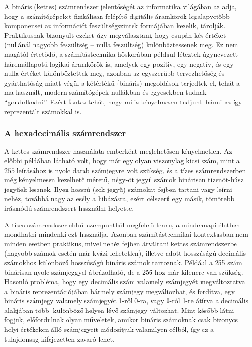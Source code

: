 A bináris (kettes) számrendszer jelentőségét az informatika világában az adja, hogy a számítógépeket fizikálisan felépítő digitális áramkörök legalapvetőbb komponensei az információt feszültségszintek formájában kezelik, tárolják. Praktikusnak bizonyult ezeket úgy megválasztani, hogy csupán két értéket (nullánál nagyobb feszültség -- nulla feszültség) különböztessenek meg. Ez nem magától értetődő, a számítástechnika hőskorában például léteztek úgynevezett háromállapotú logikai áramkörök is, amelyek egy pozitív, egy negatív, és egy nulla értéket különböztettek meg, azonban az egyszerűbb tervezhetőség és gyárthatóság miatt végül a kétértékű (bináris) megoldások terjedtek el, tehát a ma használt, modern számítógépek nullákban és egyesekben tudnak ``gondolkodni''. Ezért fontos tehát, hogy mi is kényelmesen tudjunk bánni az így reprezentált számokkal is.

\subsubsection{A hexadecimális számrendszer}
A kettes számrendszer használata emberként meglehetősen kényelmetlen. Az előbbi példában látható volt, hogy már egy olyan viszonylag kicsi szám, mint a $255$ leírásához is nyolc darab számjegyre volt szükség, és a tízes számrendszerben még kényelmesen kezelhető méretű, négy-öt jegyű számok binárisan tizenöt-húsz jegyűek lesznek. Ilyen hosszú (sok jegyű) számokat fejben tartani vagy leírni nehéz, továbbá nagy az esély a hibázásra, ezért célszerű egy másik, tömörebb írásmódú számrendszert használni helyette.

A tízes számrendszer ebből szempontból megfelelő lenne, a mindennapi életben mondhatni mindenki ezt használja. Azonban számítástechnikai kontextusban nem minden esetben praktikus, mivel nehéz fejben átváltani kettes számrendszerbe (nagyobb számok esetén már kvázi lehetetlen), illetve adott hosszúságú decimális számokhoz különböző hosszúságú bináris számok tartoznak. Például a 255 szám binárisan nyolc számjeggyel ábrázolható, de a 256-hoz már kilencre van szükség. Hasonló probléma, hogy egy decimális szám valamely számjegyét megváltoztatva a bináris reprezentációjában bármely számjegy megváltozhat, és fordítva, egy bináris számjegy valamely számjegyét 1-ről 0-ra, vagy 0-ról 1-re átírva a decimális alakjában több, különböző helyen lévő számjegy változhat. Mint később látni fogjuk, előfordulnak olyan műveletek, amikor bináris számoknak csak bizonyos helyi értékeken álló számjegyeit módosítjuk valamilyen célból, így ez a tulajdonság kifejezetten zavaró lehet.

